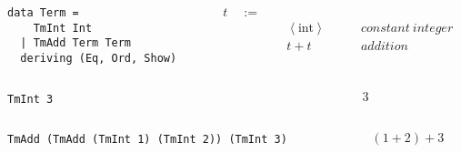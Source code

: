 \begin{frame}[fragile]
  \begin{columns}
    \begin{column}{0.5\textwidth}
  \begin{verbatim}
data Term =
    TmInt Int
  | TmAdd Term Term
  deriving (Eq, Ord, Show)
  \end{verbatim}
    \end{column}
    \begin{column}{0.5\textwidth}
    \begin{displaymath}
    \begin{aligned}
t \quad:=\quad& ~ &\\
  & ~ \left<\text{int}\right> \quad\quad &constant~integer\\
  & ~ t + t \quad\quad &addition\\
    \end{aligned}
    \end{displaymath}
    \end{column}
  \end{columns}
\end{frame}

\begin{frame}[fragile]
  \begin{columns}
    \begin{column}{0.5\textwidth}
  \begin{verbatim}
TmInt 3
  \end{verbatim}
    \end{column}
    \begin{column}{0.5\textwidth}
    \begin{displaymath}
3
    \end{displaymath}
    \end{column}
  \end{columns}
\end{frame}

\begin{frame}[fragile]
  \begin{columns}
    \begin{column}{0.5\textwidth}
  \begin{verbatim}
TmAdd (TmAdd (TmInt 1) (TmInt 2)) (TmInt 3)
  \end{verbatim}
    \end{column}
    \begin{column}{0.5\textwidth}
    \begin{displaymath}
(1 + 2) + 3
    \end{displaymath}
    \end{column}
  \end{columns}
\end{frame}

